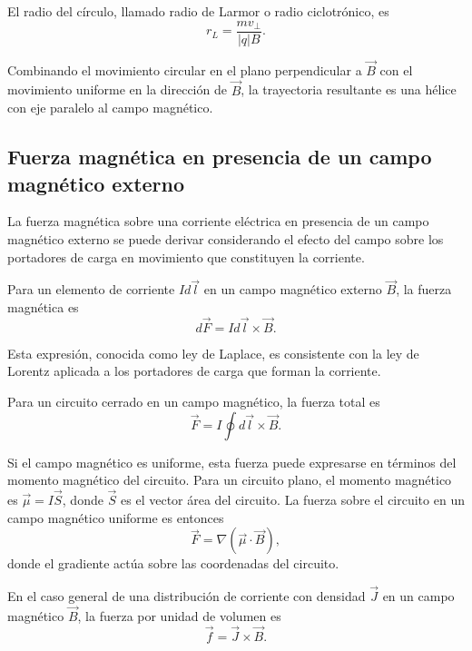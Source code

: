 \documentclass[12pt,a4paper]{book}
\begin{document}
El radio del círculo, llamado radio de Larmor o radio ciclotrónico, es
\begin{equation}
r_L = \frac{mv_{\perp}}{|q|B}.
\end{equation}

Combinando el movimiento circular en el plano perpendicular a $\vec{B}$ con el movimiento uniforme en la dirección de $\vec{B}$, la trayectoria resultante es una hélice con eje paralelo al campo magnético.

\subsection{Fuerza magnética en presencia de un campo magnético externo}

La fuerza magnética sobre una corriente eléctrica en presencia de un campo magnético externo se puede derivar considerando el efecto del campo sobre los portadores de carga en movimiento que constituyen la corriente.

Para un elemento de corriente $I d\vec{l}$ en un campo magnético externo $\vec{B}$, la fuerza magnética es
\begin{equation}
d\vec{F} = I d\vec{l} \times \vec{B}.
\end{equation}

Esta expresión, conocida como ley de Laplace, es consistente con la ley de Lorentz aplicada a los portadores de carga que forman la corriente.

Para un circuito cerrado en un campo magnético, la fuerza total es
\begin{equation}
\vec{F} = I \oint d\vec{l} \times \vec{B}.
\end{equation}

Si el campo magnético es uniforme, esta fuerza puede expresarse en términos del momento magnético del circuito. Para un circuito plano, el momento magnético es $\vec{\mu} = I\vec{S}$, donde $\vec{S}$ es el vector área del circuito. La fuerza sobre el circuito en un campo magnético uniforme es entonces
\begin{equation}
\vec{F} = \nabla(\vec{\mu} \cdot \vec{B}),
\end{equation}
donde el gradiente actúa sobre las coordenadas del circuito.

En el caso general de una distribución de corriente con densidad $\vec{J}$ en un campo magnético $\vec{B}$, la fuerza por unidad de volumen es
\begin{equation}
\vec{f} = \vec{J} \times \vec{B}.
\end{equation}
\end{document}

